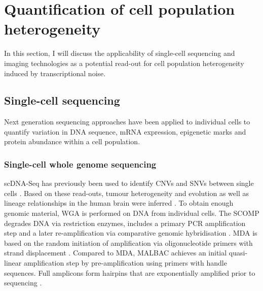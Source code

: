 
\section{Quantification of cell population heterogeneity} 

In this section, I will discuss the applicability of single-cell sequencing and imaging technologies as a potential read-out for cell population heterogeneity induced by transcriptional noise.

\subsection{Single-cell sequencing}

Next generation sequencing approaches have been applied to individual cells to quantify variation in DNA sequence, mRNA expression, epigenetic marks and protein abundance within a cell population. 

\subsubsection{Single-cell whole genome sequencing}

\Gls{scDNA-Seq} has previously been used to identify CNVs and SNVs between single cells \citep{Zong2012}. 
Based on these read-outs, tumour heterogeneity and evolution \citep{Navin2011} as well as lineage relationships in the human brain were inferred \citep{Evrony2015}. 
To obtain enough genomic material, \gls{WGA} is performed on DNA from individual cells. The \gls{SCOMP} degrades DNA via restriction enzymes, includes a primary \gls{PCR} amplification step and a later re-amplification via comparative genomic hybridisation \citep{Klein1999}. \Gls{MDA} is based on the random initiation of amplification via oligonucleotide primers with strand displacement \citep{Dean2002}. Compared to MDA, \gls{MALBAC} achieves an initial quasi-linear amplification step by pre-amplification using primers with handle sequences. 
Full amplicons form hairpins that are exponentially amplified prior to sequencing \citep{Zong2012}. \\

